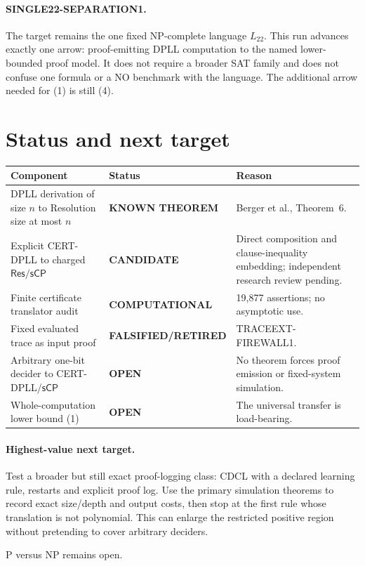 \documentclass[11pt]{article}
\newcommand{\Ltwo}{L_{22}}
\newcommand{\Res}{\mathsf{Res}}
\newcommand{\sCP}{\mathsf{sCP}}
\newcommand{\KNOWN}{\textbf{KNOWN THEOREM}}
\newcommand{\COMP}{\textbf{COMPUTATIONAL}}
\newcommand{\CAND}{\textbf{CANDIDATE}}
\newcommand{\OPEN}{\textbf{OPEN}}
\newcommand{\RET}{\textbf{FALSIFIED/RETIRED}}
\begin{document}
\paragraph{SINGLE22-SEPARATION1.}
The target remains the one fixed NP-complete language $\Ltwo$.  This run
advances exactly one arrow: proof-emitting DPLL computation to the named
lower-bounded proof model.  It does not require a broader SAT family and does
not confuse one formula or a NO benchmark with the language.  The additional
arrow needed for (1) is still (4).

\section{Status and next target}
\begin{tabularx}{\textwidth}{@{}l l X@{}}
\toprule
Component & Status & Reason\\
\midrule
DPLL derivation of size $n$ to Resolution size at most $n$ & \KNOWN & Berger et al., Theorem~6.\\
Explicit CERT-DPLL to charged $\Res/\sCP$ & \CAND & Direct composition and clause-inequality embedding; independent research review pending.\\
Finite certificate translator audit & \COMP & 19,877 assertions; no asymptotic use.\\
Fixed evaluated trace as input proof & \RET & TRACEEXT-FIREWALL1.\\
Arbitrary one-bit decider to CERT-DPLL/$\sCP$ & \OPEN & No theorem forces proof emission or fixed-system simulation.\\
Whole-computation lower bound (1) & \OPEN & The universal transfer is load-bearing.\\
\bottomrule
\end{tabularx}

\paragraph{Highest-value next target.}
Test a broader but still exact proof-logging class: CDCL with a declared
learning rule, restarts and explicit proof log.  Use the primary simulation
theorems to record exact size/depth and output costs, then stop at the first
rule whose translation is not polynomial.  This can enlarge the restricted
positive region without pretending to cover arbitrary deciders.

P versus NP remains open.
\end{document}
